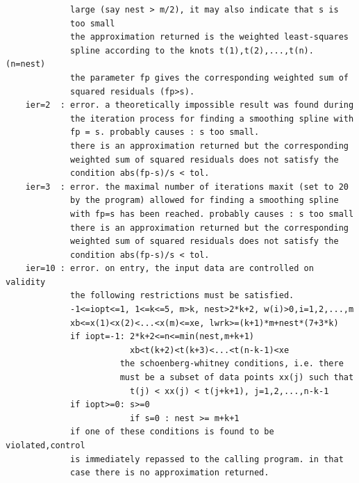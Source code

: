 \documentclass[11pt,twoside]{article}
\begin{document}
\begin{verbatim}
             large (say nest > m/2), it may also indicate that s is
             too small
             the approximation returned is the weighted least-squares
             spline according to the knots t(1),t(2),...,t(n). (n=nest)
             the parameter fp gives the corresponding weighted sum of
             squared residuals (fp>s).
    ier=2  : error. a theoretically impossible result was found during
             the iteration process for finding a smoothing spline with
             fp = s. probably causes : s too small.
             there is an approximation returned but the corresponding
             weighted sum of squared residuals does not satisfy the
             condition abs(fp-s)/s < tol.
    ier=3  : error. the maximal number of iterations maxit (set to 20
             by the program) allowed for finding a smoothing spline
             with fp=s has been reached. probably causes : s too small
             there is an approximation returned but the corresponding
             weighted sum of squared residuals does not satisfy the
             condition abs(fp-s)/s < tol.
    ier=10 : error. on entry, the input data are controlled on validity
             the following restrictions must be satisfied.
             -1<=iopt<=1, 1<=k<=5, m>k, nest>2*k+2, w(i)>0,i=1,2,...,m
             xb<=x(1)<x(2)<...<x(m)<=xe, lwrk>=(k+1)*m+nest*(7+3*k)
             if iopt=-1: 2*k+2<=n<=min(nest,m+k+1)
                         xb<t(k+2)<t(k+3)<...<t(n-k-1)<xe
                       the schoenberg-whitney conditions, i.e. there
                       must be a subset of data points xx(j) such that
                         t(j) < xx(j) < t(j+k+1), j=1,2,...,n-k-1
             if iopt>=0: s>=0
                         if s=0 : nest >= m+k+1
             if one of these conditions is found to be violated,control
             is immediately repassed to the calling program. in that
             case there is no approximation returned.


\end{verbatim}
\end{document}

